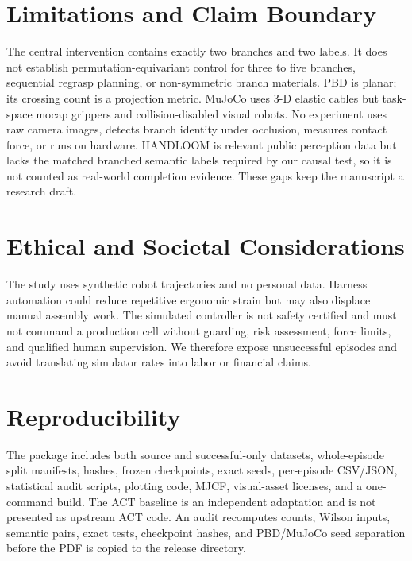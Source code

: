 \documentclass[journal]{IEEEtran}
\begin{document}
\section{Limitations and Claim Boundary}

The central intervention contains exactly two branches and two labels.  It
does not establish permutation-equivariant control for three to five branches,
sequential regrasp planning, or non-symmetric branch materials.  PBD is planar;
its crossing count is a projection metric.  MuJoCo uses 3-D elastic cables but
task-space mocap grippers and collision-disabled visual robots.  No experiment
uses raw camera images, detects branch identity under occlusion, measures
contact force, or runs on hardware.  HANDLOOM is relevant public perception
data but lacks the matched branched semantic labels required by our causal
test, so it is not counted as real-world completion evidence.  These gaps keep
the manuscript a research draft.

\section{Ethical and Societal Considerations}

The study uses synthetic robot trajectories and no personal data.  Harness
automation could reduce repetitive ergonomic strain but may also displace
manual assembly work.  The simulated controller is not safety certified and
must not command a production cell without guarding, risk assessment, force
limits, and qualified human supervision.  We therefore expose unsuccessful
episodes and avoid translating simulator rates into labor or financial claims.

\section{Reproducibility}

The package includes both source and successful-only datasets, whole-episode
split manifests, hashes, frozen checkpoints, exact seeds, per-episode CSV/JSON,
statistical audit scripts, plotting code, MJCF, visual-asset licenses, and a
one-command build.  The ACT baseline is an independent adaptation and is not
presented as upstream ACT code.  An audit recomputes counts, Wilson inputs,
semantic pairs, exact tests, checkpoint hashes, and PBD/MuJoCo seed separation
before the PDF is copied to the release directory.

\balance


\end{document}
